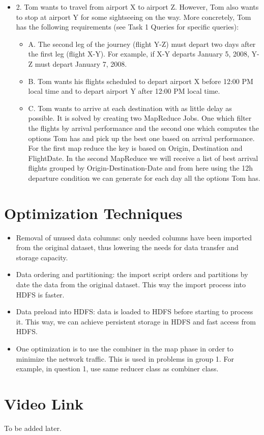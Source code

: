 \documentclass[fontsize=11pt,paper=a4]{scrartcl}
\begin{document}
\begin{itemize}
\item 2. Tom wants to travel from airport X to airport Z. However, Tom also wants to stop at airport Y for some sightseeing on the way. More concretely, Tom has the following requirements (see Task 1 Queries for specific queries):
\begin{itemize}
\item A. The second leg of the journey (flight Y-Z) must depart two days after the first leg (flight X-Y). For example, if X-Y departs January 5, 2008, Y-Z must depart January 7, 2008.
\item B. Tom wants his flights scheduled to depart airport X before 12:00 PM local time and to depart airport Y after 12:00 PM local time.
\item C. Tom wants to arrive at each destination with as little delay as possible.
It is solved by creating two MapReduce Jobs. One which filter the
flights by arrival performance and the second one which computes the options Tom has and pick up the best one based on arrival performance. For the first map reduce the key is based on Origin, Destination and FlightDate. In the second MapReduce we will receive a list of best arrival flights grouped by Origin-Destination-Date and from here using the 12h departure condition we can generate for each day all the options Tom has.
\end{itemize}
\end{itemize}

\section{Optimization Techniques}
\begin{itemize}
\item Removal of unused data columns: only needed columns have been imported from the original dataset, thus lowering the needs for data transfer and storage capacity.
\item Data ordering and partitioning: the import script orders and partitions by date the data from the original dataset. This way the import process into HDFS is faster.
\item Data preload into HDFS: data  is loaded to HDFS before starting to process it. This way, we can achieve persistent storage in HDFS and fast access from HDFS.
\item One optimization is to use the combiner in the map phase in order to minimize the network traffic. This is used in problems in group 1. For example, in question 1, use same reducer class as combiner class. 

\end{itemize} 
 
\section{Video Link}
To be added later. 
\end{document}
